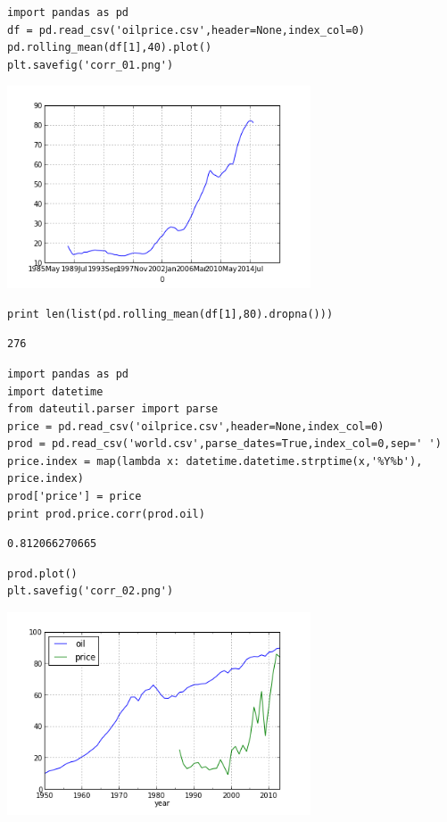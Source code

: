 \documentclass[12pt,fleqn]{article}\usepackage{../common}
\begin{document}
\begin{verbatim}
import pandas as pd
df = pd.read_csv('oilprice.csv',header=None,index_col=0)
pd.rolling_mean(df[1],40).plot()
plt.savefig('corr_01.png')
\end{verbatim}

\includegraphics[height=6cm]{corr_01.png}


\begin{verbatim}
print len(list(pd.rolling_mean(df[1],80).dropna()))
\end{verbatim}

\begin{verbatim}
276
\end{verbatim}

\begin{verbatim}
import pandas as pd
import datetime
from dateutil.parser import parse
price = pd.read_csv('oilprice.csv',header=None,index_col=0)
prod = pd.read_csv('world.csv',parse_dates=True,index_col=0,sep=' ')
price.index = map(lambda x: datetime.datetime.strptime(x,'%Y%b'), price.index)
prod['price'] = price
print prod.price.corr(prod.oil)
\end{verbatim}

\begin{verbatim}
0.812066270665
\end{verbatim}

\begin{verbatim}
prod.plot()
plt.savefig('corr_02.png')
\end{verbatim}

\includegraphics[height=6cm]{corr_02.png}
\end{document}
